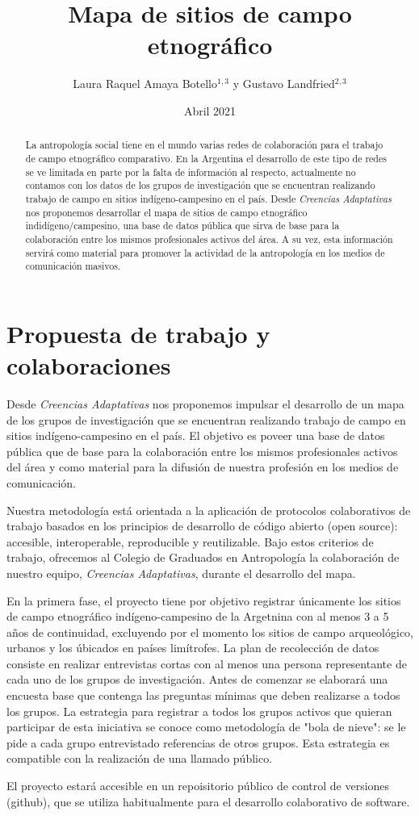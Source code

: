 \documentclass{article}
\title{Mapa de sitios de campo etnográfico}
\author{Laura Raquel Amaya Botello$^{1,3}$ y Gustavo Landfried$^{2,3}$}
\affil{\small 1 Universidad Nacional de Colombia. 2 Universidad de Buenos Aires. 3 Creencias Adaptativas}
\affil[]{Correspondencia: \url{lramayab@unal.edu.co}}
\date{Abril 2021}
\begin{document}
\maketitle

\begin{abstract}
  La antropología social tiene en el mundo varias redes de colaboración para el trabajo de campo etnográfico comparativo.
  En la Argentina el desarrollo de este tipo de redes se ve limitada en parte por la falta de información al respecto, actualmente no contamos con los datos de los grupos de investigación que se encuentran realizando trabajo de campo en sitios indígeno-campesino en el país.
  Desde \emph{Creencias Adaptativas} nos proponemos desarrollar el mapa de sitios de campo etnográfico indidígeno/campesino, una base de datos pública que sirva de base para la colaboración entre los mismos profesionales activos del área.
  A su vez, esta información servirá como material para promover la actividad de la antropología en los medios de comunicación masivos.
\end{abstract}

\section*{Propuesta de trabajo y colaboraciones}

Desde \emph{Creencias Adaptativas} nos proponemos impulsar el desarrollo de un mapa de los grupos de investigación que se encuentran realizando trabajo de campo en sitios indígeno-campesino en el país.
El objetivo es poveer una base de datos pública que de base para la colaboración entre los mismos profesionales activos del área y como material para la difusión de nuestra profesión en los medios de comunicación.

Nuestra metodología está orientada a la aplicación de protocolos colaborativos de trabajo basados en los principios de desarrollo de código abierto (open source): accesible, interoperable, reproducible y reutilizable.
Bajo estos criterios de trabajo, ofrecemos al Colegio de Graduados en Antropología la colaboración de nuestro equipo, \emph{Creencias Adaptativas}, durante el desarrollo del mapa.

En la primera fase, el proyecto tiene por objetivo registrar únicamente los sitios de campo etnográfico indígeno-campesino de la Argetnina con al menos 3 a 5 años de continuidad, excluyendo por el momento los sitios de campo arqueológico, urbanos y los úbicados en países limítrofes.
La plan de recolección de datos consiste en realizar entrevistas cortas con al menos una persona representante de cada uno de los grupos de investigación.
Antes de comenzar se elaborará una encuesta base que contenga las preguntas mínimas que deben realizarse a todos los grupos.
La estrategia para registrar a todos los grupos activos que quieran participar de esta iniciativa se conoce como metodología de "bola de nieve": se le pide a cada grupo entrevistado referencias de otros grupos.
Esta estrategia es compatible con la realización de una llamado público.

El proyecto estará accesible en un repoisitorio público de control de versiones (github), que se utiliza habitualmente para el desarrollo colaborativo de software.
\end{document}
